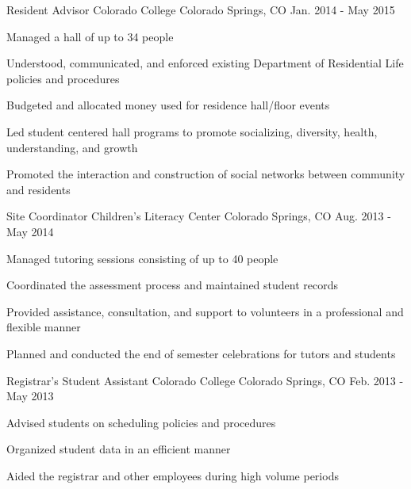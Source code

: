 \begin{cventries}

\cventry
{Resident Advisor} %
{Colorado College} %
{Colorado Springs, CO} %
{Jan. 2014 - May 2015} %
{ %
\begin{cvitems}
\item {Managed a hall of up to 34 people}
\item {Understood, communicated, and enforced existing Department of Residential Life policies and procedures}
\item{Budgeted and allocated money used for residence hall/floor events}
\item{Led student centered hall programs to promote socializing, diversity, health, understanding, and growth}
\item{Promoted the interaction and construction of social networks between community and residents}
\end{cvitems} 
}


\cventry
{Site Coordinator} %
{Children's Literacy Center} %
{Colorado Springs, CO} %
{Aug. 2013 - May 2014} %
{ %
\begin{cvitems}
\item {Managed tutoring sessions consisting of up to 40 people}
\item {Coordinated the assessment process and maintained student records}
\item {Provided assistance, consultation, and support to volunteers in a professional and flexible manner}
\item {Planned and conducted the end of semester celebrations for tutors and students}
\end{cvitems} 
}


\cventry
{Registrar's Student Assistant} %
{Colorado College} %
{Colorado Springs, CO} %
{Feb. 2013 - May 2013} %
{ %
\begin{cvitems}
\item {Advised students on scheduling policies and procedures}
\item {Organized student data in an efficient manner}
\item {Aided the registrar and other employees during high volume periods}
\end{cvitems} 
}


\end{cventries}
